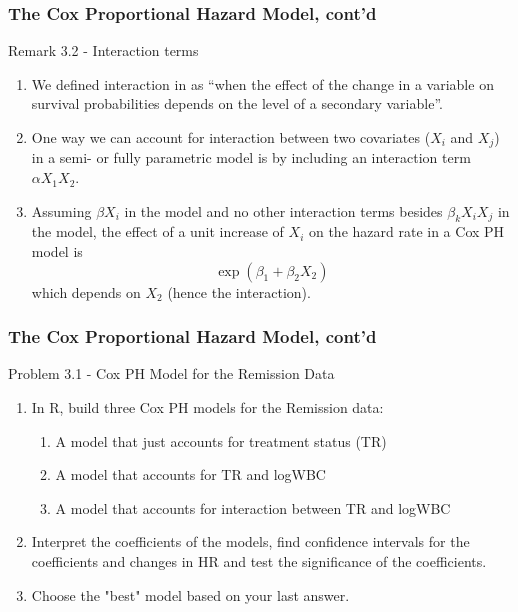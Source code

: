 \documentclass{beamer}
\theoremstyle{definition}
\begin{document}
\begin{frame}
\frametitle{The Cox Proportional Hazard Model, cont'd}
\begin{block}{Remark 3.2 - Interaction terms}
\begin{enumerate}
\item We defined interaction in  as ``when the effect of the change in a variable on survival probabilities depends on the level of a secondary variable''.
\item One way we can account for interaction between two covariates ($X_i$ and $X_j$) in a semi- or fully parametric model is by including an interaction term $\alpha X_1X_2$.
\item Assuming $\beta X_i$ in the model and no other interaction terms besides $\beta_k X_i X_j$ in the model, the effect of a unit increase of $X_i$ on the hazard rate in a Cox PH model is
\[
\exp(\beta_1 + \beta_2 X_2)
\]
which depends on $X_2$ (hence the interaction).
\end{enumerate}
\end{block}
\end{frame}

\begin{frame}
\frametitle{The Cox Proportional Hazard Model, cont'd}
\begin{block}{Problem 3.1 - Cox PH Model for the Remission Data}
\begin{enumerate}
\item In R, build three Cox PH models for the Remission data:
\begin{enumerate}[i]
\item A model that just accounts for treatment status (TR)
\item A model that accounts for TR and logWBC
\item A model that accounts for interaction between TR and logWBC
\end{enumerate}
\item Interpret the coefficients of the models, find confidence intervals for the coefficients and changes in HR and test the significance of the coefficients.
\item Choose the "best" model based on your last answer.
\end{enumerate}
\end{block}
\end{frame}
\end{document}
